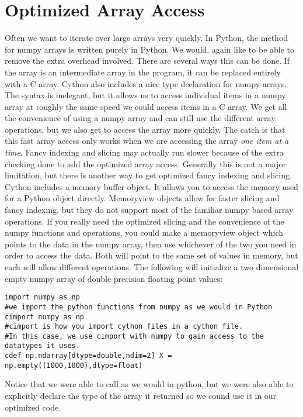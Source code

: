 \section*{Optimized Array Access}

Often we want to iterate over large arrays very quickly.
In Python, the  method for numpy arrays is written purely in Python.
We would, again like to be able to remove the extra overhead involved.
There are several ways this can be done.
If the array is an intermediate array in the program, it can be replaced entirely with a C array.
Cython also includes a nice type declaration for numpy arrays.
The syntax is inelegant, but it allows us to access individual items in a numpy array at roughly the same speed we could access items in a C array.
We get all the convenience of using a numpy array and can still use the different array operations, but we also get to access the array more quickly.
The catch is that this fast array access only works when we are accessing the array \textit{one item at a time}.
Fancy indexing and slicing may actually run slower because of the extra checking done to add the optimized array access.
Generally this is not a major limitation, but there is another way to get optimized fancy indexing and slicing.
Cython includes a memory buffer object.
It allows you to access the memory used for a Python object directly.
Memoryview objects allow for faster slicing and fancy indexing, but they do not support most of the familiar numpy based array operations.
If you really need the optimized slicing and the convenience of the numpy functions and operations, you could make a memoryview object which points to the data in the numpy array, then use whichever of the two you need in order to access the data.
Both will point to the same set of values in memory, but each will allow different operations.
The following will initialize a two dimensional empty numpy array  of double precision floating point values:
\begin{lstlisting}
import numpy as np
#we import the python functions from numpy as we would in Python
cimport numpy as np
#cimport is how you import cython files in a cython file. 
#In this case, we use cimport with numpy to gain access to the datatypes it uses.
cdef np.ndarray[dtype=double,ndim=2] X = np.empty((1000,1000),dtype=float)
\end{lstlisting}
Notice that we were able to call  as we would in python, but we were also able to explicitly declare the type of the array it returned so we cound use it in our optimized code.

